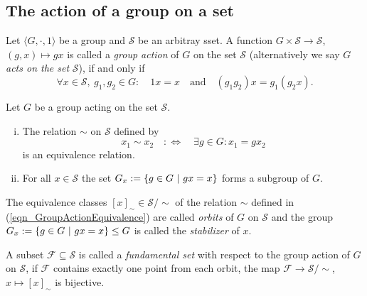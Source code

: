 \subsection{The action of a group on a set}

\begin{definition}
\label{dfn_GroupAction}
Let $\langle G, \cdot, 1 \rangle$ be a group and $\mathcal{S}$ be an arbitray sset. A function $G \times \mathcal{S} \to \mathcal{S}$, $(g, x) \mapsto g x$ is called a \emph{group action} of $G$ on the set $\mathcal{S}$ (alternatively we say $G$ \emph{acts on the set} $\mathcal{S}$), if and only if
\begin{equation*}
\forall x \in \mathcal{S},\ g_1, g_2 \in G:\quad 1 x = x \quad \text{and} \quad (g_1 g_2) x = g_1 (g_2 x).
\end{equation*}
\end{definition}

\begin{theorem}
Let $G$ be a group acting on the set $\mathcal{S}$.
\begin{enumerate}[(i)]
\item The relation $\sim$ on $\mathcal{S}$ defined by
\begin{equation}
\label{eqn_GroupActionEquivalence}
x_1 \sim x_2 \quad:\Leftrightarrow\quad \exists g \in G: x_1 = g x_2
\end{equation}
is an equivalence relation.
\item For all $x \in \mathcal{S}$ the set $G_x := \{ g \in G \ | \ gx = x \}$ forms a subgroup of $G$.
\end{enumerate}
\end{theorem}

\begin{definition}
\label{dfn_OrbitStabilizer}
The equivalence classes $[x]_\sim \in \mathcal{S}/\sim$ of the relation $\sim$ defined in (\ref{eqn_GroupActionEquivalence}) are called \emph{orbits} of $G$ on $\mathcal{S}$ and the group $G_x := \{ g \in G \ | \ gx = x \} \le G$ is called the \emph{stabilizer} of $x$.
\end{definition}

\begin{definition}
\label{dfn_FundamentalSet}
A subset $\mathcal{F} \subseteq \mathcal{S}$ is called a \emph{fundamental set} with respect to the group action of $G$ on $\mathcal{S}$, if $\mathcal{F}$ contains exactly one point from each orbit, \ie the map $\mathcal{F} \to \mathcal{S}/\sim$, $x \mapsto [x]_\sim$ is bijective.
\end{definition}

